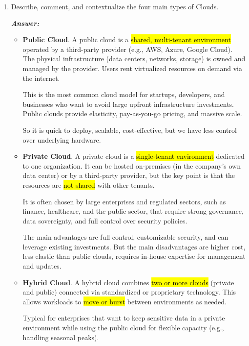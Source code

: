 \begin{enumerate}
    \item Describe, comment, and contextualize the four main types of Clouds.

    \textcolor{Green3}{\textbf{\emph{Answer:}}}
    \begin{itemize}
        \item \textbf{Public Cloud}. A public cloud is a \hl{shared, multi-tenant environment} operated by a third-party provider (e.g., AWS, Azure, Google Cloud). The physical infrastructure (data centers, networks, storage) is owned and managed by the provider. Users rent virtualized resources on demand via the internet.

        \highspace
        This is the most common cloud model for startups, developers, and businesses who want to avoid large upfront infrastructure investments. Public clouds provide elasticity, pay-as-you-go pricing, and massive scale.

        \highspace
        So it is quick to deploy, scalable, cost-effective, but we have less control over underlying hardware.


        \item \textbf{Private Cloud}. A private cloud is a \hl{single-tenant environment} dedicated to one organization. It can be hosted on-premises (in the company's own data center) or by a third-party provider, but the key point is that the resources are \hl{not shared} with other tenants.
        
        \highspace
        It is often chosen by large enterprises and regulated sectors, such as finance, healthcare, and the public sector, that require strong governance, data sovereignty, and full control over security policies.

        \highspace
        The main advantages are full control, customizable security, and can leverage existing investments. But the main disadvantages are higher cost, less elastic than public clouds, requires in-house expertise for management and updates.

        
        \item \textbf{Hybrid Cloud}. A hybrid cloud combines \hl{two or more clouds} (private and public) connected via standardized or proprietary technology. This allows workloads to \hl{move or burst} between environments as needed.
        
        \highspace
        Typical for enterprises that want to keep sensitive data in a private environment while using the public cloud for flexible capacity (e.g., handling seasonal peaks).


\end{itemize}
\end{enumerate}
